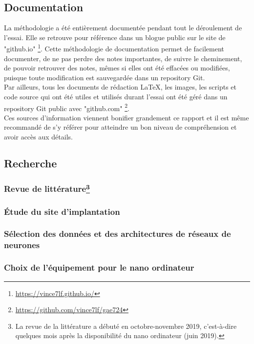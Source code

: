 \subsection{Documentation}
\noindent La méthodologie a été entièrement documentée pendant tout le déroulement de l'essai. Elle se retrouve pour référence dans un blogue public sur le site de "github.io" \footnote{\url{https://vince7lf.github.io/}}. Cette méthodologie de documentation permet de facilement documenter, de ne pas perdre des notes importantes, de suivre le cheminement, de pouvoir retrouver des notes, mêmes si elles ont été effacées ou modifiées, puisque toute modification est sauvegardée dans un repository Git.
\vspace{\baselineskip}
\\
\noindent Par ailleurs, tous les documents de rédaction LaTeX, les images, les scripts et code source qui ont été utiles et utilisés durant l'essai ont été géré dans un repository Git public avec "github.com" \footnote{\url{https://github.com/vince7lf/gae724}}. 
\vspace{\baselineskip}
\\
\noindent Ces sources d'information viennent bonifier grandement ce rapport et il est même recommandé de s'y référer pour atteindre un bon niveau de compréhension et avoir accès aux détails. 
\subsection{Recherche}

\subsubsection[Revue de littérature]{Revue de littérature\footnote{La revue de la littérature a débuté en octobre-novembre 2019, c'est-à-dire quelques mois après la disponibilité du nano ordinateur (juin 2019).}}

\subsubsection{Étude du site d'implantation}

\subsubsection{Sélection des données et des architectures de réseaux de neurones}

\subsubsection{Choix de l'équipement pour le nano ordinateur}

